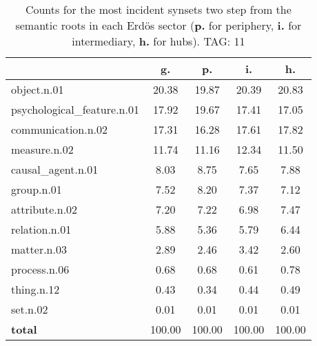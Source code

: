 \begin{table}[h!]
\begin{center}
\begin{tabular}{| l || c | c | c | c |}\hline
 & {\bf g.} & {\bf p.} & {\bf i.} & {\bf h.} \\\hline\hline
object.n.01 & 20.38  & 19.87  & 20.39  & 20.83 \\\hline
psychological\_feature.n.01 & 17.92  & 19.67  & 17.41  & 17.05 \\\hline
communication.n.02 & 17.31  & 16.28  & 17.61  & 17.82 \\\hline
measure.n.02 & 11.74  & 11.16  & 12.34  & 11.50 \\\hline
causal\_agent.n.01 & 8.03  & 8.75  & 7.65  & 7.88 \\\hline
group.n.01 & 7.52  & 8.20  & 7.37  & 7.12 \\\hline
attribute.n.02 & 7.20  & 7.22  & 6.98  & 7.47 \\\hline
relation.n.01 & 5.88  & 5.36  & 5.79  & 6.44 \\\hline
matter.n.03 & 2.89  & 2.46  & 3.42  & 2.60 \\\hline
process.n.06 & 0.68  & 0.68  & 0.61  & 0.78 \\\hline
thing.n.12 & 0.43  & 0.34  & 0.44  & 0.49 \\\hline
set.n.02 & 0.01  & 0.01  & 0.01  & 0.01 \\\hline\hline
{{\bf total}} & 100.00  & 100.00  & 100.00  & 100.00 \\\hline
\end{tabular}
\caption{Counts for the most incident synsets two step from the semantic roots in each Erd\"os sector ({\bf p.} for periphery, {\bf i.} for intermediary, {\bf h.} for hubs). TAG: 11}
\end{center}
\end{table}